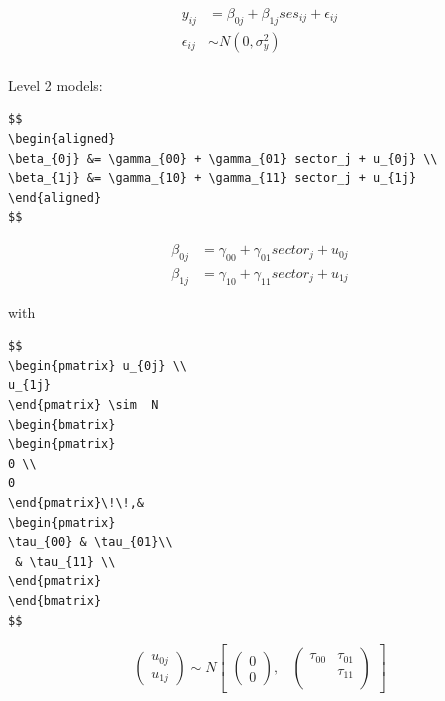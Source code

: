 \documentclass[
  letterpaper,
  DIV=11,
  numbers=noendperiod]{scrreprt}
\begin{document}
\[
\begin{aligned}
y_{ij} &= \beta_{0j} + \beta_{1j} ses_{ij} +  \epsilon_{ij} \\
\epsilon_{ij} &\sim N( 0, \sigma^2_y ) \\
\end{aligned}
\]

Level 2 models:

\begin{verbatim}
$$
\begin{aligned}
\beta_{0j} &= \gamma_{00} + \gamma_{01} sector_j + u_{0j} \\
\beta_{1j} &= \gamma_{10} + \gamma_{11} sector_j + u_{1j} 
\end{aligned}
$$
\end{verbatim}

\[
\begin{aligned}
\beta_{0j} &= \gamma_{00} + \gamma_{01} sector_j + u_{0j} \\
\beta_{1j} &= \gamma_{10} + \gamma_{11} sector_j + u_{1j} 
\end{aligned}
\]

with

\begin{verbatim}
$$
\begin{pmatrix} u_{0j} \\
u_{1j}
\end{pmatrix} \sim  N
\begin{bmatrix}
\begin{pmatrix}
0 \\
0
\end{pmatrix}\!\!,&
\begin{pmatrix}
\tau_{00} & \tau_{01}\\
 & \tau_{11} \\
\end{pmatrix}
\end{bmatrix}
$$
\end{verbatim}

\[
\begin{pmatrix} u_{0j} \\
u_{1j}
\end{pmatrix} \sim  N
\begin{bmatrix}
\begin{pmatrix}
0 \\
0
\end{pmatrix}\!\!,&
\begin{pmatrix}
\tau_{00} & \tau_{01}\\
 & \tau_{11} \\
\end{pmatrix}
\end{bmatrix}
\]
\end{document}
